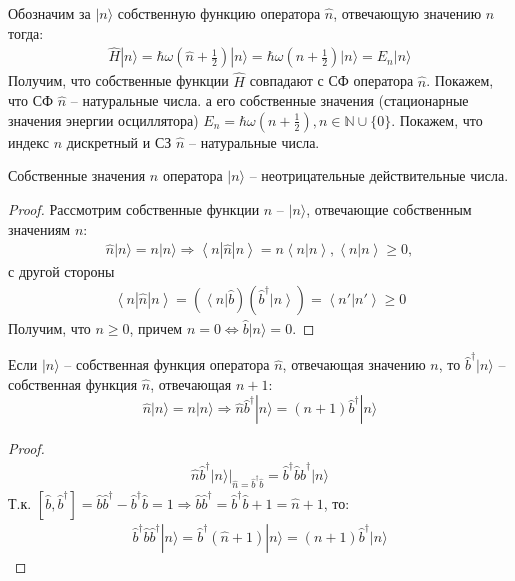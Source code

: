 \documentclass[__main__.tex]{subfiles}
\begin{document}
Обозначим за $|n\rangle$ собственную функцию оператора $\hat{n}$, отвечающую значению $n$ тогда:
\begin{gather*}
\hat{H}|n\rangle
=
\hbar\omega\left(\hat{n}+\frac{1}{2}\right)|n\rangle
=
\hbar\omega\left(n+\frac{1}{2}\right)|n\rangle
=
E_n|n\rangle
\end{gather*}
Получим, что собственные функции $\hat{H}$ совпадают с СФ оператора $\hat{n}$. Покажем, что СФ $\hat{n}$ -- натуральные числа. а его собственные значения (стационарные значения энергии осциллятора) $E_n=\hbar\omega\left(n+\frac{1}{2}\right),n\in\mathbb{N}\cup\{0\}$. Покажем, что индекс $n$ дискретный и СЗ $\hat{n}$ -- натуральные числа.

\begin{theorem}
	Собственные значения $n$ оператора $|n\rangle$ -- неотрицательные действительные числа.
\end{theorem}
\begin{proof}
	Рассмотрим собственные функции $\hat{n}$ -- $|n\rangle$, отвечающие собственным значениям $n$:
	\begin{gather*}
	\hat{n}|n\rangle = n|n\rangle
	\Longrightarrow
	\left< n| \hat{n}|n\right> = n \left<n|n\right>, \left<n|n\right> \ge 0,
	\end{gather*}
	с другой стороны
	\begin{gather*}
	\left< n| \hat{n}|n\right> = (\left< n\right|\hat{b})(\hat{b}^\dagger\left|n\right>) =
	\left< n'|n'\right> \ge 0
	\end{gather*}
	Получим, что $n\ge 0$, причем $n=0\Leftrightarrow \hat{b}|n\rangle = 0$.
\end{proof}
\begin{theorem}
	Если $|n\rangle$ -- собственная функция оператора $\hat{n}$, отвечающая значению $n$, то $\hat{b}^\dagger|n\rangle$ -- собственная функция $\hat{n}$, отвечающая $n+1$:
	$$
	\hat{n}|n\rangle=n|n\rangle\Longrightarrow\hat{n}\hat{b}^\dagger|n\rangle=(n+1)\hat{b}^\dagger|n\rangle
	$$
\end{theorem}
\begin{proof}
	\begin{gather*}
	\hat{n}\hat{b}^\dagger|n\rangle
	|_{\hat{n}=\hat{b}^\dagger\hat{b}}
	=
	\hat{b}^\dagger\hat{b}\hat{b}^\dagger|n\rangle
	\end{gather*}
	Т.к. $[\hat{b},\hat{b}^\dagger]=\hat{b}\hat{b}^\dagger-\hat{b}^\dagger\hat{b}=1\Longrightarrow\hat{b}\hat{b}^\dagger=\hat{b}^\dagger\hat{b}+1=\hat{n}+1$, то:
	\begin{gather*}
	\hat{b}^\dagger\hat{b}\hat{b}^\dagger|n\rangle
	=
	\hat{b}^\dagger(\hat{n}+1)|n\rangle
	=
	(n+1)\hat{b}^\dagger|n\rangle
	\end{gather*}
\end{proof}
\end{document}
